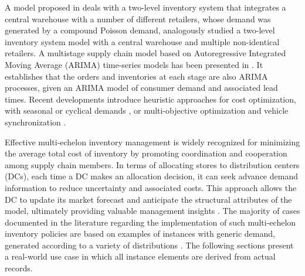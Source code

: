 \documentclass[ijoc,sglanonrev]{informs4}
\begin{document}

A  model proposed in \citep{Axsater00} deals with a two-level inventory system that integrates a central warehouse with a number of different retailers, whose  demand was generated by a compound Poisson demand, analogously \citep{Andersson00} studied a two-level inventory system model with a central warehouse and multiple non-identical retailers.
A multistage supply chain model based on Autoregressive Integrated Moving Average (ARIMA) time-series models has been presented in \citep{gilbert2005arima}. It establishes that the orders and inventories at each stage are also ARIMA processes, given an ARIMA model of consumer demand and associated lead times.
Recent developments introduce heuristic approaches for cost optimization, with seasonal or cyclical demands  \citep{Sakulsom19}, or multi-objective optimization and vehicle synchronization \citep{ANHC21}.

Effective multi-echelon inventory management is widely recognized for minimizing the average total cost of inventory by promoting coordination and cooperation among supply chain members. 
In terms of allocating stores to distribution centers (DCs), each time a DC makes an allocation decision, it can seek advance demand information to reduce uncertainty and associated costs. This approach allows the DC to update its market forecast and anticipate the structural attributes of the model, ultimately providing valuable management insights \citep{P16}.
The majority of cases documented in the literature regarding the implementation of such multi-echelon inventory policies are based on examples of instances with generic demand, generated according to a variety of distributions \citep{Escorcia20,EG81}. The following sections present a real-world use case in which all instance elements are derived from actual records.
\end{document}
